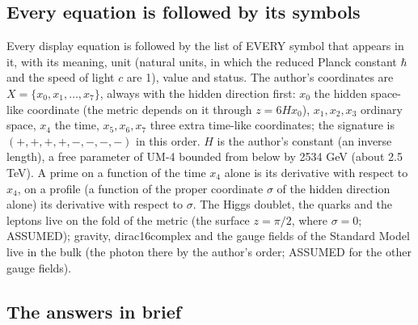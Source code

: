 \documentclass[
  10pt,
]{article}
\begin{document}
\hypertarget{every-equation-is-followed-by-its-symbols}{%
\subsection{Every equation is followed by its
symbols}\label{every-equation-is-followed-by-its-symbols}}

Every display equation is followed by the list of EVERY symbol that
appears in it, with its meaning, unit (natural units, in which the
reduced Planck constant \(\hbar\) and the speed of light \(c\) are 1),
value and status. The author's coordinates are
\(X = \{x_0, x_1, \dots, x_7\}\), always with the hidden direction
first: \(x_0\) the hidden space-like coordinate (the metric depends on
it through \(z = 6Hx_0\)), \(x_1, x_2, x_3\) ordinary space, \(x_4\) the
time, \(x_5, x_6, x_7\) three extra time-like coordinates; the signature
is \((+,+,+,+,-,-,-,-)\) in this order. \(H\) is the author's constant
(an inverse length), a free parameter of UM-4 bounded from below by 2534
GeV (about 2.5 TeV). A prime on a function of the time \(x_4\) alone is
its derivative with respect to \(x_4\), on a profile (a function of the
proper coordinate \(\sigma\) of the hidden direction alone) its
derivative with respect to \(\sigma\). The Higgs doublet, the quarks and
the leptons live on the fold of the metric (the surface \(z = \pi/2\),
where \(\sigma = 0\); ASSUMED); gravity, dirac16complex and the gauge
fields of the Standard Model live in the bulk (the photon there by the
author's order; ASSUMED for the other gauge fields).

\hypertarget{the-answers-in-brief}{%
\subsection{The answers in brief}\label{the-answers-in-brief}}
\end{document}
